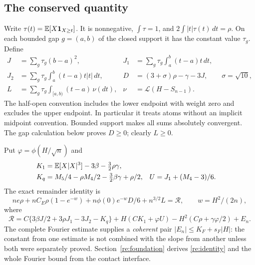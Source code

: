 \subsection{The conserved quantity}
Write $\tau(t)=\mathbb E[X\mathbf1_{X\ge t}]$. It is nonnegative,
$\int\tau=1$, and $2\int|t|\tau(t)\,dt=\rho$. On each bounded gap
$g=(a,b)$ of the closed support it has the constant value $\tau_g$.
Define
\begin{align*}
 J&=\sum_g\tau_g(b-a)^2,&
 J_1&=\sum_g\tau_g\int_a^b(t-a)t\,dt,\\
 J_2&=\sum_g\tau_g\int_a^b(t-a)t|t|\,dt,&
 D&=(3+\sigma)\rho-\gamma-3J,\qquad\sigma=\sqrt{10},\\
 L&=\sum_g\tau_g\int_{[a,b)}(t-a)\,\nu(dt),&
 \nu&=\mathcal L(H-S_{n-1}).
\end{align*}
The half-open convention includes the lower endpoint with weight zero
and excludes the upper endpoint. In particular it treats atoms without
an implicit midpoint convention. Bounded support makes all sums
absolutely convergent. The gap calculation below proves $D\ge0$;
clearly $L\ge0$.

Put $\varphi=\phi(H/\sqrt n)$ and
\begin{align*}
 K_1&=\mathbb E[X|X|^3]-3\beta-\tfrac32\rho\gamma,\\
 K_q&=M_5/4-\rho M_4/2-\tfrac32\beta\gamma+\rho/2,
 &U&=J_1+(M_4-3)/6.
\end{align*}
The exact remainder identity is
\begin{equation}\label{re:identity}
 ne\rho+nC_E\rho(1-e^{-w})+
 n\phi(0)e^{-w}D/6+n^{3/2}L=\mathcal R,
 \qquad w=H^2/(2n),
\end{equation}
where
\begin{equation}\label{re:raw}
 \mathcal R=C\{3\beta J/2+3\rho J_1-3J_2-K_q\}
 +H(CK_1+\varphi U)-H^2(C\rho+\gamma\varphi/2)+E_n.
\end{equation}
The complete Fourier estimate supplies a \emph{coherent} pair
$|E_n|\le K_F+s_F|H|$: the constant from one estimate is not combined
with the slope from another unless both were separately proved.
Section~\ref{re:foundation} derives \eqref{re:identity} and the whole
Fourier bound from the contact interface.

